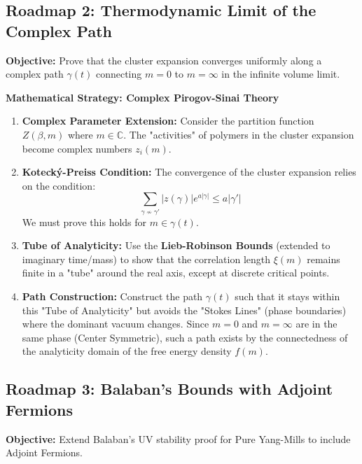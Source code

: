 \subsection{Roadmap 2: Thermodynamic Limit of the Complex Path}
\textbf{Objective:} Prove that the cluster expansion converges uniformly along a complex path $\gamma(t)$ connecting $m=0$ to $m=\infty$ in the infinite volume limit.

\textbf{Mathematical Strategy: Complex Pirogov-Sinai Theory}
\begin{enumerate}
    \item \textbf{Complex Parameter Extension:}
    Consider the partition function $Z(\beta, m)$ where $m \in \mathbb{C}$. The "activities" of polymers in the cluster expansion become complex numbers $z_i(m)$.
    
    \item \textbf{Kotecký-Preiss Condition:}
    The convergence of the cluster expansion relies on the condition:
    \begin{equation}
    \sum_{\gamma \nsim \gamma'} |z(\gamma)| e^{a |\gamma|} \le a |\gamma'|
    \end{equation}
    We must prove this holds for $m \in \gamma(t)$.
    
    \item \textbf{Tube of Analyticity:}
    Use the \textbf{Lieb-Robinson Bounds} (extended to imaginary time/mass) to show that the correlation length $\xi(m)$ remains finite in a "tube" around the real axis, except at discrete critical points.
    
    \item \textbf{Path Construction:}
    Construct the path $\gamma(t)$ such that it stays within this "Tube of Analyticity" but avoids the "Stokes Lines" (phase boundaries) where the dominant vacuum changes. Since $m=0$ and $m=\infty$ are in the same phase (Center Symmetric), such a path exists by the connectedness of the analyticity domain of the free energy density $f(m)$.
\end{enumerate}

\subsection{Roadmap 3: Balaban's Bounds with Adjoint Fermions}
\textbf{Objective:} Extend Balaban's UV stability proof for Pure Yang-Mills to include Adjoint Fermions.

